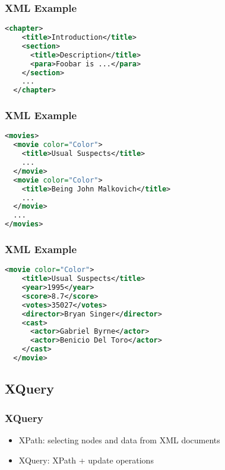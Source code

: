 \documentclass[dvipsnames]{beamer}
\theoremstyle{plain}
\begin{document}
\begin{frame}[fragile]
  \frametitle{XML Example}

  \begin{example}[DocBook]
    \begin{lstlisting}[language=XML]
  <chapter>
    <title>Introduction</title>
    <section>
      <title>Description</title>
      <para>Foobar is ...</para>
    </section>
    ...
  </chapter>
    \end{lstlisting}
  \end{example}
\end{frame}

\begin{frame}[fragile]
  \frametitle{XML Example}

  \begin{example}[movies]
    \begin{lstlisting}[language=XML]
<movies>
  <movie color="Color">
    <title>Usual Suspects</title>
    ...
  </movie>
  <movie color="Color">
    <title>Being John Malkovich</title>
    ...
  </movie>
  ...
</movies>
    \end{lstlisting}
  \end{example}
\end{frame}

\begin{frame}[fragile]
  \frametitle{XML Example}

  \begin{example}[movies]
    \begin{lstlisting}[language=XML]
  <movie color="Color">
    <title>Usual Suspects</title>
    <year>1995</year>
    <score>8.7</score>
    <votes>35027</votes>
    <director>Bryan Singer</director>
    <cast>
      <actor>Gabriel Byrne</actor>
      <actor>Benicio Del Toro</actor>
    </cast>
  </movie>
    \end{lstlisting}
  \end{example}
\end{frame}

\subsection{XQuery}

\begin{frame}
  \frametitle{XQuery}

  \begin{itemize}
    \item XPath: selecting nodes and data from XML documents
    \item XQuery: XPath + update operations
  \end{itemize}
\end{frame}
\end{document}

